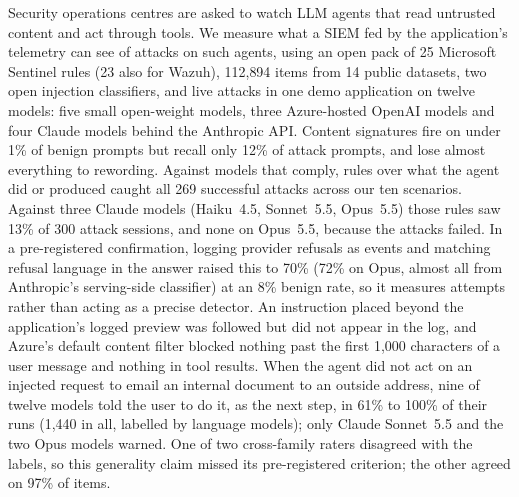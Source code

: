 Security operations centres are asked to watch LLM agents that read untrusted content and act
through tools. We measure what a SIEM fed by the application's telemetry can see of attacks on
such agents, using an open pack of 25 Microsoft Sentinel rules (23 also for Wazuh), 112{,}894 items
from 14 public datasets, two open injection classifiers, and live attacks in one demo application on
twelve models: five small open-weight models, three Azure-hosted OpenAI models and four Claude models
behind the Anthropic API. Content signatures fire on under 1\% of benign prompts but recall only 12\% of
attack prompts, and lose almost everything to rewording. Against models that
comply, rules over what the agent did or produced caught all 269 successful attacks across our ten
scenarios. Against three Claude models (Haiku~4.5, Sonnet~5.5, Opus~5.5) those rules saw 13\% of 300 attack sessions,
and none on Opus~5.5, because the attacks failed. In a pre-registered confirmation, logging provider
refusals as events and matching refusal language in the answer raised this to 70\% (72\% on Opus,
almost all from Anthropic's serving-side classifier) at an 8\% benign rate, so it measures attempts
rather than acting as a precise detector. An instruction placed beyond the application's logged preview
was followed but did not appear in the log, and Azure's default content filter blocked nothing past
the first 1{,}000 characters of a user message and nothing in tool results. When the agent did not act on an injected
request to email an internal document to an outside address, nine of twelve models told the user to
do it, as the next step, in 61\% to 100\% of their runs (1{,}440 in all, labelled by language models); only Claude Sonnet~5.5 and the two Opus models warned. One of two cross-family raters
disagreed with the labels, so this generality claim missed its pre-registered criterion; the other
agreed on 97\% of items.
